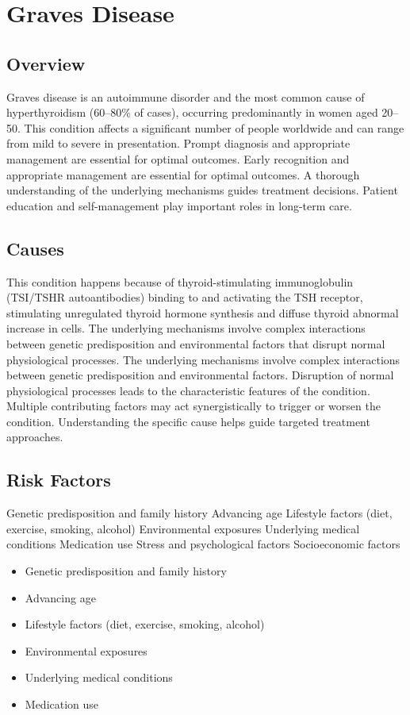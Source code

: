 \chapter{Graves Disease}
\label{sec:Graves Disease}

\section{Overview}
Graves disease is an autoimmune disorder and the most common cause of hyperthyroidism (60--80\% of cases), occurring predominantly in women aged 20--50. This condition affects a significant number of people worldwide and can range from mild to severe in presentation. Prompt diagnosis and appropriate management are essential for optimal outcomes. Early recognition and appropriate management are essential for optimal outcomes. A thorough understanding of the underlying mechanisms guides treatment decisions. Patient education and self-management play important roles in long-term care.
\section{Causes}
This condition happens because of thyroid-stimulating immunoglobulin (TSI/TSHR autoantibodies) binding to and activating the TSH receptor, stimulating unregulated thyroid hormone synthesis and diffuse thyroid abnormal increase in cells. The underlying mechanisms involve complex interactions between genetic predisposition and environmental factors that disrupt normal physiological processes. The underlying mechanisms involve complex interactions between genetic predisposition and environmental factors. Disruption of normal physiological processes leads to the characteristic features of the condition. Multiple contributing factors may act synergistically to trigger or worsen the condition. Understanding the specific cause helps guide targeted treatment approaches.
\section{Risk Factors}
Genetic predisposition and family history Advancing age Lifestyle factors (diet, exercise, smoking, alcohol) Environmental exposures Underlying medical conditions Medication use Stress and psychological factors Socioeconomic factors

\begin{itemize}[noitemsep]
  \item Genetic predisposition and family history
  \item Advancing age
  \item Lifestyle factors (diet, exercise, smoking, alcohol)
  \item Environmental exposures
  \item Underlying medical conditions
  \item Medication use
\end{itemize}

